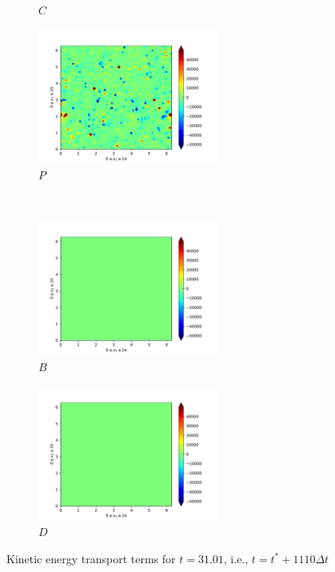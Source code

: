 \begin{figure}[H]
\begin{subfigure}{0.45\textwidth}
        \caption{$C$}
    \end{subfigure}
    \newline
    \begin{subfigure}{0.45\textwidth}
        \includegraphics[height=1.75in]{media/run-cds-65-25k/P-ke-449}
        \caption{$P$}
    \end{subfigure}
    ~
    \begin{subfigure}{0.45\textwidth}
        \includegraphics[height=1.75in]{media/run-cds-65-25k/B-ke-449}
        \caption{$B$}
    \end{subfigure}
    \newline
    \begin{subfigure}{0.45\textwidth}
        \includegraphics[height=1.75in]{media/run-cds-65-25k/D-ke-449}
        \caption{$D$}
    \end{subfigure}
    \caption{Kinetic energy transport terms for $t=31.01$, i.e., $t=t^{\ast} + 1110 \Delta t$}
\end{figure}
